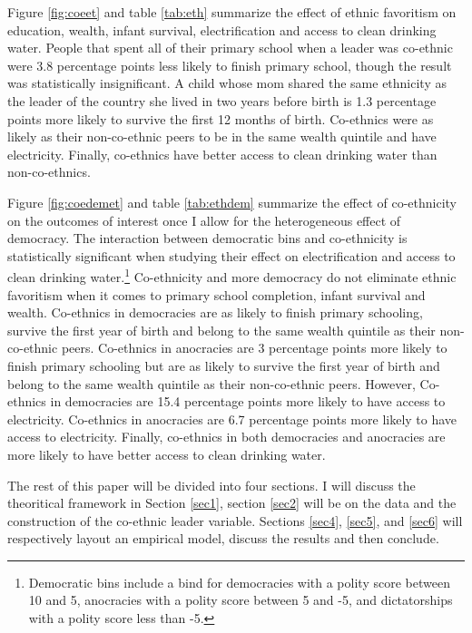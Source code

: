 \documentclass{wptemp}
\begin{document}
Figure \ref{fig:coeet} and table \ref{tab:eth} summarize the effect of ethnic favoritism on education, wealth, infant survival, electrification and access to clean drinking water. People that spent all of their primary school when a leader was co-ethnic were 3.8 percentage points less likely to finish primary school, though the result was statistically insignificant. A child whose mom shared the same ethnicity as the leader of the country she lived in two years before birth is 1.3 percentage points more likely to survive the first 12 months of birth. Co-ethnics were as likely as their non-co-ethnic peers to be in the same wealth quintile and have electricity. Finally, co-ethnics have better access to clean drinking water than non-co-ethnics.

Figure \ref{fig:coedemet} and table \ref{tab:ethdem} summarize the effect of co-ethnicity on the outcomes of interest once I allow for the heterogeneous effect of democracy. The interaction between democratic bins and co-ethnicity is statistically significant when studying their effect on electrification and access to clean drinking water.\footnote{Democratic bins include a bind for democracies with a polity score between 10 and 5, anocracies with a polity score between 5 and -5, and dictatorships with a polity score less than -5.} Co-ethnicity and more democracy do not eliminate ethnic favoritism when it comes to primary school completion, infant survival and wealth. Co-ethnics in democracies are as likely to finish primary schooling, survive the first year of birth and belong to the same wealth quintile as their non-co-ethnic peers. Co-ethnics in anocracies are 3 percentage points more likely to finish primary schooling but are as likely to survive the first year of birth and belong to the same wealth quintile as their non-co-ethnic peers.  However, Co-ethnics in democracies are 15.4 percentage points more likely to have access to electricity. Co-ethnics in anocracies are 6.7 percentage points more likely to have access to electricity. Finally, co-ethnics in both democracies and anocracies are more likely to have better access to clean drinking water.

The rest of this paper will be divided into four sections. I will discuss the theoritical framework in Section \ref{sec1}, section \ref{sec2} will be on the data and the construction of the co-ethnic leader variable. Sections \ref{sec4}, \ref{sec5}, and \ref{sec6} will respectively layout an empirical model, discuss the results and then conclude. 
\end{document}
